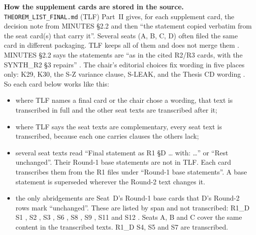 \textbf{How the supplement cards are stored in the source.} \texttt{THEOREM\_LIST\_FINAL.md} (TLF) Part~II gives, for each supplement card, the decision note from MINUTES §2.2 and then ``the statement copied verbatim from the seat card(s) that carry it''. Several seats (A, B, C, D) often filed the same card in different packaging. TLF keeps all of them and does not merge them . MINUTES §2.2 says the statements are ``as in the cited R2/R3 cards, with the SYNTH\_R2 §3 repairs'' . The chair's editorial choices fix wording in five places only: K29, K30, the S-Z variance clause, S-LEAK, and the Thesis CD wording . So each card below works like this:
\begin{itemize}
\item where TLF names a final card or the chair chose a wording, that text is transcribed in full and the other seat texts are transcribed after it;
\item where TLF says the seat texts are complementary, every seat text is transcribed, because each one carries clauses the others lack;
\item several seat texts read ``Final statement as R1 §D \ldots{} with: \ldots'' or ``Rest unchanged''. Their Round-1 base statements are not in TLF. Each card transcribes them from the R1 files under ``Round-1 base statements''. A base statement is superseded wherever the Round-2 text changes it.
\item the only abridgements are Seat~D's Round-1 base cards that D's Round-2 rows mark ``unchanged''. These are listed by span and not transcribed: R1\_D S1 , S2 , S3 , S6 , S8 , S9 , S11  and S12 . Seats A, B and C cover the same content in the transcribed texts. R1\_D S4, S5 and S7 are transcribed.
\end{itemize}

